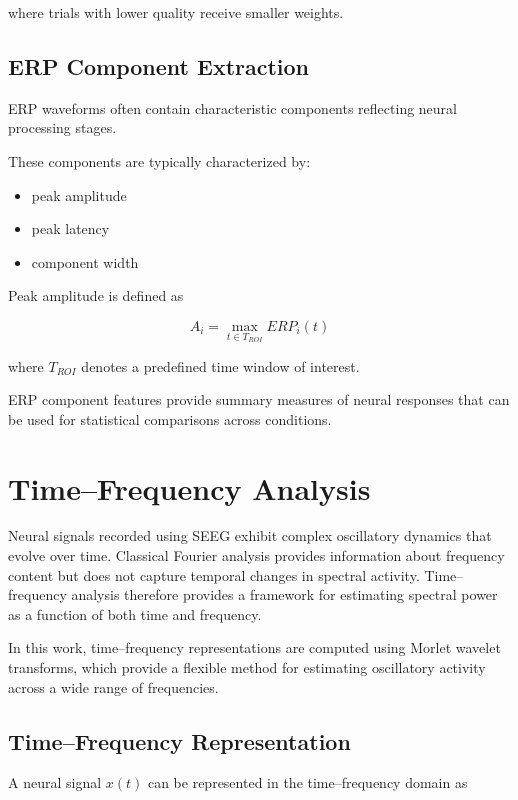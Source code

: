 \documentclass[11pt]{report}
\begin{document}
where trials with lower quality receive smaller weights.

\section{ERP Component Extraction}

ERP waveforms often contain characteristic components
reflecting neural processing stages.

These components are typically characterized by:

\begin{itemize}
\item peak amplitude
\item peak latency
\item component width
\end{itemize}

Peak amplitude is defined as

\begin{equation}
A_i =
\max_{t \in T_{ROI}} ERP_i(t)
\end{equation}

where $T_{ROI}$ denotes a predefined time window of interest.

ERP component features provide summary measures of neural
responses that can be used for statistical comparisons across
conditions.




\chapter{Time--Frequency Analysis}

Neural signals recorded using SEEG exhibit complex oscillatory
dynamics that evolve over time. Classical Fourier analysis provides
information about frequency content but does not capture temporal
changes in spectral activity. Time--frequency analysis therefore
provides a framework for estimating spectral power as a function
of both time and frequency.

In this work, time--frequency representations are computed using
Morlet wavelet transforms, which provide a flexible method for
estimating oscillatory activity across a wide range of frequencies.

\section{Time--Frequency Representation}

A neural signal $x(t)$ can be represented in the time--frequency
domain as
\end{document}
